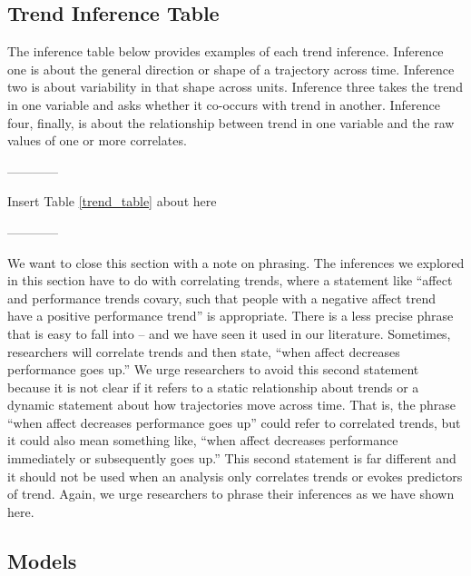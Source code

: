 \documentclass[english,,man]{apa6}
\theoremstyle{definition}
\theoremstyle{definition}
\theoremstyle{definition}
\theoremstyle{remark}
\begin{document}
\hypertarget{trend-inference-table}{%
\subsection{Trend Inference Table}\label{trend-inference-table}}

The inference table below provides examples of each trend inference.
Inference one is about the general direction or shape of a trajectory
across time. Inference two is about variability in that shape across
units. Inference three takes the trend in one variable and asks whether
it co-occurs with trend in another. Inference four, finally, is about
the relationship between trend in one variable and the raw values of one
or more correlates.

\begin{center}

------------

Insert Table \ref{trend_table} about here

------------

\end{center}

We want to close this section with a note on phrasing. The inferences we
explored in this section have to do with correlating trends, where a
statement like \enquote{affect and performance trends covary, such that
people with a negative affect trend have a positive performance trend}
is appropriate. There is a less precise phrase that is easy to fall into
-- and we have seen it used in our literature. Sometimes, researchers
will correlate trends and then state, \enquote{when affect decreases
performance goes up.} We urge researchers to avoid this second statement
because it is not clear if it refers to a static relationship about
trends or a dynamic statement about how trajectories move across time.
That is, the phrase \enquote{when affect decreases performance goes up}
could refer to correlated trends, but it could also mean something like,
\enquote{when affect decreases performance immediately or subsequently
goes up.} This second statement is far different and it should not be
used when an analysis only correlates trends or evokes predictors of
trend. Again, we urge researchers to phrase their inferences as we have
shown here.

\hypertarget{models-1}{%
\subsection{Models}\label{models-1}}
\end{document}

